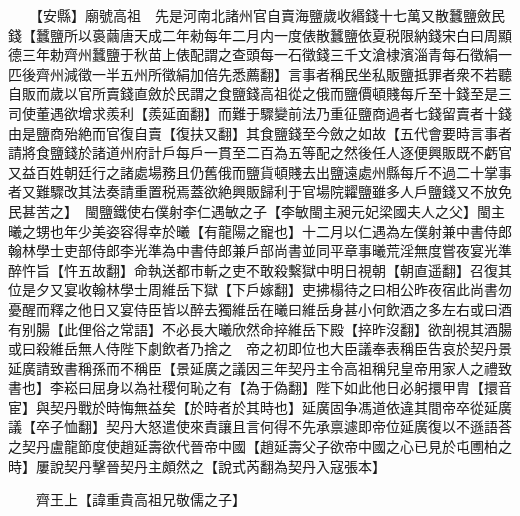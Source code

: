 　　【安縣】廟號高祖　先是河南北諸州官自賣海鹽歲收緡錢十七萬又散蠶鹽斂民錢【蠶鹽所以裛繭唐天成二年勑每年二月内一度俵散蠶鹽依夏税限納錢宋白曰周顯德三年勅齊州蠶鹽于秋苗上俵配謂之查頭每一石徵錢三千文滄棣濱淄青每石徵絹一匹後齊州減徵一半五州所徵絹加倍先悉薦翻】言事者稱民坐私販鹽抵罪者衆不若聽自販而歲以官所賣錢直斂於民謂之食鹽錢高祖從之俄而鹽價頓賤每斤至十錢至是三司使董遇欲增求羨利【羨延面翻】而難于驟變前法乃重征鹽商過者七錢留賣者十錢由是鹽商殆絶而官復自賣【復扶又翻】其食鹽錢至今斂之如故【五代會要時言事者請將食鹽錢於諸道州府計戶每戶一貫至二百為五等配之然後任人逐便興販既不虧官又益百姓朝廷行之諸處場務且仍舊俄而鹽貨頓賤去出鹽遠處州縣每斤不過二十掌事者又難驟改其法奏請重置税焉蓋欲絶興販歸利于官場院糶鹽雖多人戶鹽錢又不放免民甚苦之】　閩鹽鐵使右僕射李仁遇敏之子【李敏閩主昶元妃梁國夫人之父】閩主曦之甥也年少美姿容得幸於曦【有龍陽之寵也】十二月以仁遇為左僕射兼中書侍郎翰林學士吏部侍郎李光準為中書侍郎兼戶部尚書並同平章事曦荒淫無度嘗夜宴光準醉忤旨【忤五故翻】命執送都市斬之吏不敢殺繫獄中明日視朝【朝直遥翻】召復其位是夕又宴收翰林學士周維岳下獄【下戶嫁翻】吏拂榻待之曰相公昨夜宿此尚書勿憂醒而釋之他日又宴侍臣皆以醉去獨維岳在曦曰維岳身甚小何飲酒之多左右或曰酒有别腸【此俚俗之常語】不必長大曦欣然命捽維岳下殿【捽昨沒翻】欲剖視其酒腸或曰殺維岳無人侍陛下劇飲者乃捨之　帝之初即位也大臣議奉表稱臣告哀於契丹景延廣請致書稱孫而不稱臣【景延廣之議因三年契丹主令高祖稱兒皇帝用家人之禮致書也】李崧曰屈身以為社稷何恥之有【為于偽翻】陛下如此他日必躬擐甲胄【擐音宦】與契丹戰於時悔無益矣【於時者於其時也】延廣固争馮道依違其間帝卒從延廣議【卒子恤翻】契丹大怒遣使來責讓且言何得不先承禀遽即帝位延廣復以不遜語荅之契丹盧龍節度使趙延壽欲代晉帝中國【趙延壽父子欲帝中國之心已見於屯圑柏之時】屢說契丹擊晉契丹主頗然之【說式芮翻為契丹入寇張本】

　　齊王上【諱重貴高祖兄敬儒之子】


